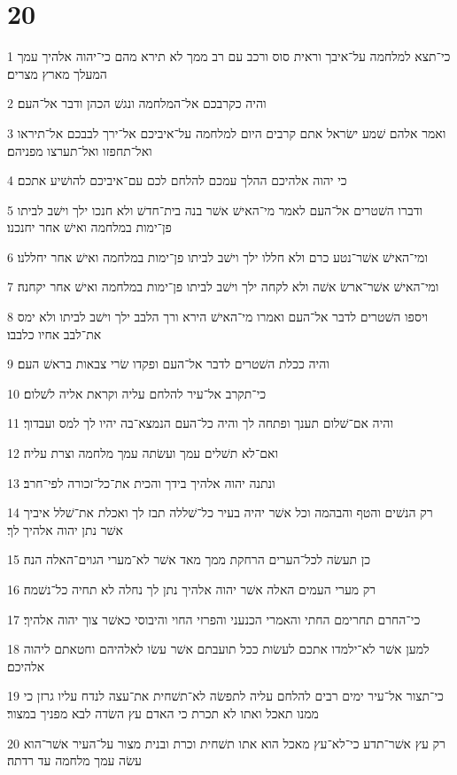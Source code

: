 \chapter{20}

\par 1 כי־תצא למלחמה על־איבך וראית סוס ורכב עם רב ממך לא תירא מהם כי־יהוה אלהיך עמך המעלך מארץ מצרים׃
\par 2 והיה כקרבכם אל־המלחמה ונגשׁ הכהן ודבר אל־העם׃
\par 3 ואמר אלהם שׁמע ישׂראל אתם קרבים היום למלחמה על־איביכם אל־ירך לבבכם אל־תיראו ואל־תחפזו ואל־תערצו מפניהם׃
\par 4 כי יהוה אלהיכם ההלך עמכם להלחם לכם עם־איביכם להושׁיע אתכם׃
\par 5 ודברו השׁטרים אל־העם לאמר מי־האישׁ אשׁר בנה בית־חדשׁ ולא חנכו ילך וישׁב לביתו פן־ימות במלחמה ואישׁ אחר יחנכנו׃
\par 6 ומי־האישׁ אשׁר־נטע כרם ולא חללו ילך וישׁב לביתו פן־ימות במלחמה ואישׁ אחר יחללנו׃
\par 7 ומי־האישׁ אשׁר־ארשׂ אשׁה ולא לקחה ילך וישׁב לביתו פן־ימות במלחמה ואישׁ אחר יקחנה׃
\par 8 ויספו השׁטרים לדבר אל־העם ואמרו מי־האישׁ הירא ורך הלבב ילך וישׁב לביתו ולא ימס את־לבב אחיו כלבבו׃
\par 9 והיה ככלת השׁטרים לדבר אל־העם ופקדו שׂרי צבאות בראשׁ העם׃
\par 10 כי־תקרב אל־עיר להלחם עליה וקראת אליה לשׁלום׃
\par 11 והיה אם־שׁלום תענך ופתחה לך והיה כל־העם הנמצא־בה יהיו לך למס ועבדוך׃
\par 12 ואם־לא תשׁלים עמך ועשׂתה עמך מלחמה וצרת עליה׃
\par 13 ונתנה יהוה אלהיך בידך והכית את־כל־זכורה לפי־חרב׃
\par 14 רק הנשׁים והטף והבהמה וכל אשׁר יהיה בעיר כל־שׁללה תבז לך ואכלת את־שׁלל איביך אשׁר נתן יהוה אלהיך לך׃
\par 15 כן תעשׂה לכל־הערים הרחקת ממך מאד אשׁר לא־מערי הגוים־האלה הנה׃
\par 16 רק מערי העמים האלה אשׁר יהוה אלהיך נתן לך נחלה לא תחיה כל־נשׁמה׃
\par 17 כי־החרם תחרימם החתי והאמרי הכנעני והפרזי החוי והיבוסי כאשׁר צוך יהוה אלהיך׃
\par 18 למען אשׁר לא־ילמדו אתכם לעשׂות ככל תועבתם אשׁר עשׂו לאלהיהם וחטאתם ליהוה אלהיכם׃
\par 19 כי־תצור אל־עיר ימים רבים להלחם עליה לתפשׂה לא־תשׁחית את־עצה לנדח עליו גרזן כי ממנו תאכל ואתו לא תכרת כי האדם עץ השׂדה לבא מפניך במצור׃
\par 20 רק עץ אשׁר־תדע כי־לא־עץ מאכל הוא אתו תשׁחית וכרת ובנית מצור על־העיר אשׁר־הוא עשׂה עמך מלחמה עד רדתה׃

